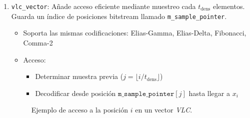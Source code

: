 \begin{enumerate}
\begin{enumerate}
            \item \texttt{vlc\_vector}:
            Añade acceso eficiente mediante muestreo cada \(t_{\text{dens}}\) elementos. Guarda un índice de posiciones bitstream llamado \texttt{m\_sample\_pointer}.

            \begin{itemize}
                \item Soporta las mismas codificaciones: Elias-Gamma, Elias-Delta, Fibonacci, Comma-2
                \item Acceso:
                    \begin{itemize}
                        \item Determinar muestra previa (\(j = \lfloor i / t_{\text{dens}} \rfloor\))
                        \item Decodificar desde posición \(\texttt{m\_sample\_pointer}[j]\) hasta llegar a \(x_i\)
                    \end{itemize}
            \end{itemize}

            \begin{figure}[H]
                \centering
                \caption[Ejemplo \texttt{vlc\_vector}]{Ejemplo de acceso a la posición $i$ en un vector \textit{VLC}.}
                \label{dac_vector}
            \end{figure}


\end{enumerate}
\end{enumerate}
